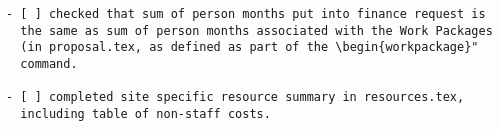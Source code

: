 \begin{draft}
\vspace{1cm}

\begin{verbatim}
- [ ] checked that sum of person months put into finance request is
  the same as sum of person months associated with the Work Packages
  (in proposal.tex, as defined as part of the \begin{workpackage}"
  command.
  
- [ ] completed site specific resource summary in resources.tex,
  including table of non-staff costs.

\end{verbatim}
\end{draft}

